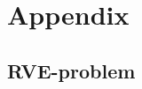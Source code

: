 \documentclass[10pt,a4paper,fleqn]{article}
\renewcommand{\ta}[1]{\mathbfit{#1}}
\renewcommand{\ts}[1]{\mathbfit{#1}}
\begin{document}
%
%

%
\printbibliography

\appendix
\section{Appendix}
\subsection{RVE-problem}
\end{document}
